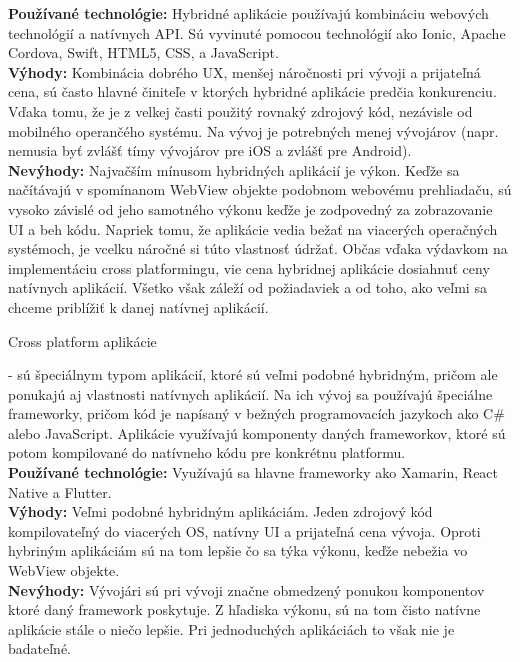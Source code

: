 \begin{itemize}[leftmargin=*]
{\bf Používané technológie:} Hybridné aplikácie používajú kombináciu webových technológií a natívnych API. Sú vyvinuté pomocou technológií ako Ionic, Apache Cordova, Swift, HTML5, CSS, a JavaScript.  \\

{\bf Výhody:} Kombinácia dobrého UX, menšej náročnosti pri vývoji a prijateľná cena, sú často hlavné činiteľe v ktorých hybridné aplikácie predčia konkurenciu. Vďaka tomu, že je z velkej časti použitý rovnaký zdrojový kód, nezávisle od mobilného operančého systému. Na vývoj je potrebných menej vývojárov (napr. nemusia byť zvlášť tímy vývojárov pre iOS a zvlášť pre Android).  \\
 
{\bf Nevýhody: }  Najvačším mínusom hybridných aplikácií je výkon. Keďže sa načítávajú v spomínanom WebView objekte podobnom webovému prehliadaču, sú vysoko závislé od jeho samotného výkonu keďže je zodpovedný za zobrazovanie UI a beh kódu. Napriek tomu, že aplikácie vedia bežať na viacerých operačných systémoch, je vcelku náročné si túto vlastnosť údržať. Občas vďaka výdavkom na implementáciu cross platformingu, vie cena hybridnej aplikácie dosiahnuť ceny natívnych aplikácií. Všetko však záleží od požiadaviek a od toho, ako veľmi sa chceme priblížiť k danej natívnej aplikácií.\\


{\bf \item Cross platform aplikácie} - sú špeciálnym typom aplikácií, ktoré sú veľmi podobné hybridným, pričom ale ponukajú aj vlastnosti natívnych aplikácií. Na ich vývoj sa používajú špeciálne frameworky, pričom kód je napísaný v bežných programovacích jazykoch ako C\# alebo JavaScript. Aplikácie využívajú komponenty daných frameworkov, ktoré sú potom kompilované do natívneho kódu pre konkrétnu platformu. \\


{\bf Používané technológie:} Využívajú sa hlavne frameworky ako Xamarin, React Native a Flutter.  \\

{\bf Výhody:} Veľmi podobné hybridným aplikáciám. Jeden zdrojový kód kompilovateľný do viacerých OS, natívny UI a prijateľná cena vývoja. Oproti hybriným aplikáciám sú na tom lepšie čo sa týka výkonu, keďže nebežia vo WebView objekte.  \\
 
{\bf Nevýhody:} Vývojári sú pri vývoji značne obmedzený ponukou komponentov ktoré daný framework poskytuje. Z hľadiska výkonu,  sú na tom čisto natívne aplikácie stále o niečo lepšie. Pri jednoduchých aplikáciách to však nie je badateľné.  \\
\end{itemize}


